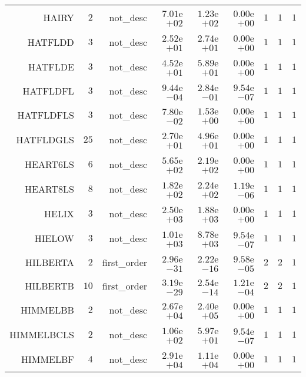 \begin{longtable}{rrrrrrrrr}
HAIRY & \(     2\) & not\_desc & \( 7.01\)e\(+02\) & \( 1.23\)e\(+02\) & \( 0.00\)e\(+00\) & \(     1\) & \(     1\) & \(     1\) \\
HATFLDD & \(     3\) & not\_desc & \( 2.52\)e\(+01\) & \( 2.74\)e\(+01\) & \( 0.00\)e\(+00\) & \(     1\) & \(     1\) & \(     1\) \\
HATFLDE & \(     3\) & not\_desc & \( 4.52\)e\(+01\) & \( 5.89\)e\(+01\) & \( 0.00\)e\(+00\) & \(     1\) & \(     1\) & \(     1\) \\
HATFLDFL & \(     3\) & not\_desc & \( 9.44\)e\(-04\) & \( 2.84\)e\(-01\) & \( 9.54\)e\(-07\) & \(     1\) & \(     1\) & \(     1\) \\
HATFLDFLS & \(     3\) & not\_desc & \( 7.80\)e\(-02\) & \( 1.53\)e\(+00\) & \( 0.00\)e\(+00\) & \(     1\) & \(     1\) & \(     1\) \\
HATFLDGLS & \(    25\) & not\_desc & \( 2.70\)e\(+01\) & \( 4.96\)e\(+01\) & \( 0.00\)e\(+00\) & \(     1\) & \(     1\) & \(     1\) \\
HEART6LS & \(     6\) & not\_desc & \( 5.65\)e\(+02\) & \( 2.19\)e\(+02\) & \( 0.00\)e\(+00\) & \(     1\) & \(     1\) & \(     1\) \\
HEART8LS & \(     8\) & not\_desc & \( 1.82\)e\(+02\) & \( 2.24\)e\(+02\) & \( 1.19\)e\(-06\) & \(     1\) & \(     1\) & \(     1\) \\
HELIX & \(     3\) & not\_desc & \( 2.50\)e\(+03\) & \( 1.88\)e\(+03\) & \( 0.00\)e\(+00\) & \(     1\) & \(     1\) & \(     1\) \\
HIELOW & \(     3\) & not\_desc & \( 1.01\)e\(+03\) & \( 8.78\)e\(+03\) & \( 9.54\)e\(-07\) & \(     1\) & \(     1\) & \(     1\) \\
HILBERTA & \(     2\) & first\_order & \( 2.96\)e\(-31\) & \( 2.22\)e\(-16\) & \( 9.58\)e\(-05\) & \(     2\) & \(     2\) & \(     1\) \\
HILBERTB & \(    10\) & first\_order & \( 3.19\)e\(-29\) & \( 2.54\)e\(-14\) & \( 1.21\)e\(-04\) & \(     2\) & \(     2\) & \(     1\) \\
HIMMELBB & \(     2\) & not\_desc & \( 2.67\)e\(+04\) & \( 2.40\)e\(+05\) & \( 0.00\)e\(+00\) & \(     1\) & \(     1\) & \(     1\) \\
HIMMELBCLS & \(     2\) & not\_desc & \( 1.06\)e\(+02\) & \( 5.97\)e\(+01\) & \( 9.54\)e\(-07\) & \(     1\) & \(     1\) & \(     1\) \\
HIMMELBF & \(     4\) & not\_desc & \( 2.91\)e\(+04\) & \( 1.11\)e\(+04\) & \( 0.00\)e\(+00\) & \(     1\) & \(     1\) & \(     1\) \\

\end{longtable}
